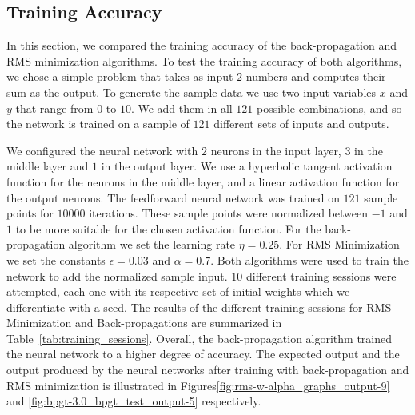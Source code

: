 \documentclass[11pt]{article}
\begin{document}
\subsection{Training Accuracy} %
\label{sub:training_accuracy}

In this section, we compared the training accuracy of the back-propagation and RMS minimization algorithms. To test the training
accuracy of both algorithms, we chose a simple problem that takes as input $2$ numbers and computes their sum as the output. To generate
the sample data we use two input variables $x$ and $y$ that range from $0$ to $10$. We add them in all $121$ possible combinations, and
so the network is trained on a sample of $121$ different sets of inputs and outputs.

We configured the neural network with $2$ neurons in the input layer, $3$ in the middle layer and $1$ in the output layer. We use a
hyperbolic tangent activation function for the neurons in the middle layer, and a linear activation function for the output neurons. The
feedforward neural network was trained on $121$ sample points for $10000$ iterations. These sample points were normalized between $-1$
and $1$ to be more suitable for the chosen activation function. For the back-propagation algorithm we set the learning rate $\eta=0.25$.
For RMS Minimization we set the constants $\epsilon=0.03$ and $\alpha=0.7$. Both algorithms were used to train the network to add the
normalized sample input. $10$ different training sessions were attempted, each one with its respective set of initial weights which we
differentiate with a seed. The results of the different training sessions for RMS Minimization and Back-propagations are summarized in
Table~\ref{tab:training_sessions}. Overall, the back-propagation algorithm trained the neural network to a higher degree of accuracy.
The expected output and the output produced by the neural networks after training with back-propagation and RMS minimization is
illustrated in Figures\ref{fig:rms-w-alpha_graphs_output-9} and \ref{fig:bpgt-3.0_bpgt_test_output-5} respectively.
\end{document}
